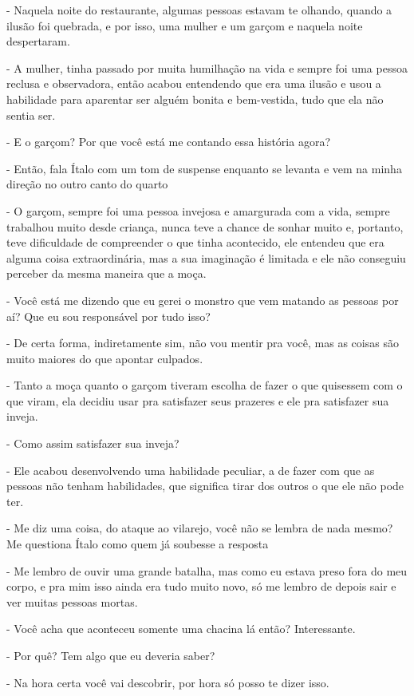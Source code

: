 - Naquela noite do restaurante, algumas pessoas estavam te olhando, quando a ilusão foi quebrada, e por isso, uma mulher e um garçom e naquela noite despertaram.

- A mulher, tinha passado por muita humilhação na vida e sempre foi uma pessoa reclusa e observadora, então acabou entendendo que era uma ilusão e usou a habilidade para aparentar ser alguém bonita e bem-vestida, tudo que ela não sentia ser.

- E o garçom? Por que você está me contando essa história agora?

- Então, fala Ítalo com um tom de suspense enquanto se levanta e vem na minha direção no outro canto do quarto

- O garçom, sempre foi uma pessoa invejosa e amargurada com a vida, sempre trabalhou muito desde criança, nunca teve a chance de sonhar muito e, portanto, teve dificuldade de compreender o que tinha acontecido, ele entendeu que era alguma coisa extraordinária, mas a sua imaginação é limitada e ele não conseguiu perceber da mesma maneira que a moça.

- Você está me dizendo que eu gerei o monstro que vem matando as pessoas por aí? Que eu sou responsável por tudo isso?

- De certa forma, indiretamente sim, não vou mentir pra você, mas as coisas são muito maiores do que apontar culpados.

- Tanto a moça quanto o garçom tiveram escolha de fazer o que quisessem com o que viram, ela decidiu usar pra satisfazer seus prazeres e ele pra satisfazer sua inveja.

- Como assim satisfazer sua inveja?

- Ele acabou desenvolvendo uma habilidade peculiar, a de fazer com que as pessoas não tenham habilidades, que significa tirar dos outros o que ele não pode ter.

- Me diz uma coisa, do ataque ao vilarejo, você não se lembra de nada mesmo? Me questiona Ítalo como quem já soubesse a resposta

- Me lembro de ouvir uma grande batalha, mas como eu estava preso fora do meu corpo, e pra mim isso ainda era tudo muito novo, só me lembro de depois sair e ver muitas pessoas mortas.

- Você acha que aconteceu somente uma chacina lá então? Interessante.

- Por quê? Tem algo que eu deveria saber?

- Na hora certa você vai descobrir, por hora só posso te dizer isso.

